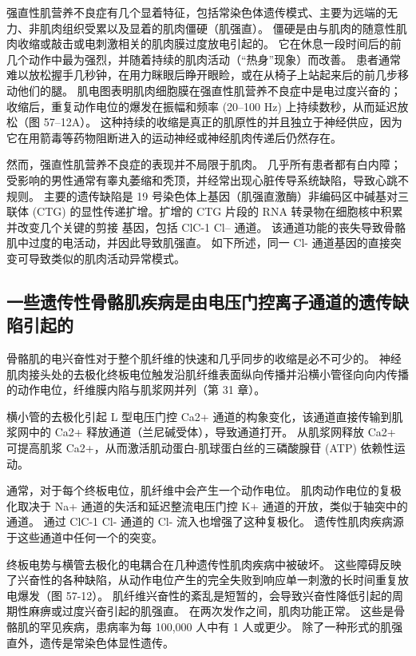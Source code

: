强直性肌营养不良症有几个显着特征，包括常染色体遗传模式、主要为远端的无力、非肌肉组织受累以及显着的肌肉僵硬（肌强直）。 僵硬是由与肌肉的随意性肌肉收缩或敲击或电刺激相关的肌肉膜过度放电引起的。 它在休息一段时间后的前几个动作中最为强烈，并随着持续的肌肉活动（“热身”现象）而改善。 患者通常难以放松握手几秒钟，在用力眯眼后睁开眼睑，或在从椅子上站起来后的前几步移动他们的腿。 肌电图表明肌肉细胞膜在强直性肌营养不良症中是电过度兴奋的； 收缩后，重复动作电位的爆发在振幅和频率 (20–100 Hz) 上持续数秒，从而延迟放松（图 57–12A）。 这种持续的收缩是真正的肌原性的并且独立于神经供应，因为它在用箭毒等药物阻断进入的运动神经或神经肌肉传递后仍然存在。

然而，强直性肌营养不良症的表现并不局限于肌肉。 几乎所有患者都有白内障； 受影响的男性通常有睾丸萎缩和秃顶，并经常出现心脏传导系统缺陷，导致心跳不规则。 主要的遗传缺陷是 19 号染色体上基因（肌强直激酶）非编码区中碱基对三联体 (CTG) 的显性传递扩增。扩增的 CTG 片段的 RNA 转录物在细胞核中积累并改变几个关键的剪接 基因，包括 ClC-1 Cl– 通道。 该通道功能的丧失导致骨骼肌中过度的电活动，并因此导致肌强直。 如下所述，同一 Cl- 通道基因的直接突变可导致类似的肌肉活动异常模式。

\subsection{一些遗传性骨骼肌疾病是由电压门控离子通道的遗传缺陷引起的}

骨骼肌的电兴奋性对于整个肌纤维的快速和几乎同步的收缩是必不可少的。 神经肌肉接头处的去极化终板电位触发沿肌纤维表面纵向传播并沿横小管径向向内传播的动作电位，纤维膜内陷与肌浆网并列（第 31 章）。

横小管的去极化引起 L 型电压门控 Ca2+ 通道的构象变化，该通道直接传输到肌浆网中的 Ca2+ 释放通道（兰尼碱受体），导致通道打开。 从肌浆网释放 Ca2+ 可提高肌浆 Ca2+，从而激活肌动蛋白-肌球蛋白丝的三磷酸腺苷 (ATP) 依赖性运动。

通常，对于每个终板电位，肌纤维中会产生一个动作电位。 肌肉动作电位的复极化取决于 Na+ 通道的失活和延迟整流电压门控 K+ 通道的开放，类似于轴突中的通道。 通过 ClC-1 Cl- 通道的 Cl- 流入也增强了这种复极化。 遗传性肌肉疾病源于这些通道中任何一个的突变。

终板电势与横管去极化的电耦合在几种遗传性肌肉疾病中被破坏。 这些障碍反映了兴奋性的各种缺陷，从动作电位产生的完全失败到响应单一刺激的长时间重复放电爆发（图 57-12）。 肌纤维兴奋性的紊乱是短暂的，会导致兴奋性降低引起的周期性麻痹或过度兴奋引起的肌强直。 在两次发作之间，肌肉功能正常。 这些是骨骼肌的罕见疾病，患病率为每 100,000 人中有 1 人或更少。 除了一种形式的肌强直外，遗传是常染色体显性遗传。

